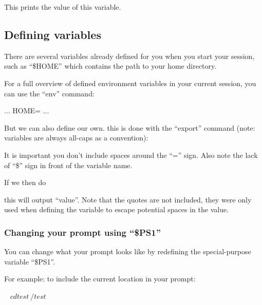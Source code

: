 \begin{prompt}
\end{prompt}

This prints the value of this variable.

\subsection{Defining variables}

There are several variables already defined for you when you start your
session, such as ``\$HOME'' which contains the path to your home directory.

For a full overview of defined environment variables in your current session,
you can use the ``env'' command:

\begin{prompt}
...
HOME=%
...
\end{prompt}

But we can also define our own. this is done with the ``export'' command (note:
variables are always all-caps as a convention):

\begin{prompt}
\end{prompt}

It is important you don't include spaces around the ``='' sign. Also note
the lack of ``\$'' sign in front of the variable name.

If we then do

\begin{prompt}
\end{prompt}

this will output ``value''. Note that the quotes are not included, they were
only used when defining the variable to escape potential spaces in the value.

\subsubsection{Changing your prompt using ``\$PS1''}

You can change what your prompt looks like by redefining the special-purpose
variable ``\$PS1''.

For example: to include the current location in your prompt:

\begin{prompt}
~ $ cd test
~/test $
\end{prompt}

